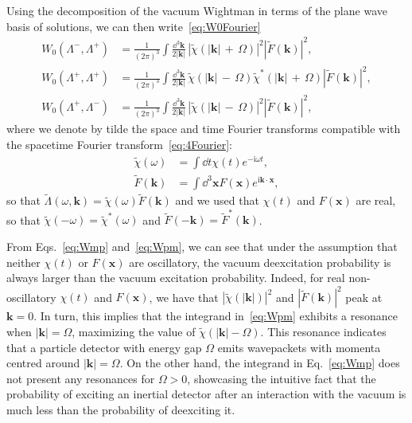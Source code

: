 \documentclass[letterpaper,12pt,titlepage,oneside,final]{book}
\newcommand{\ii}{\mathrm{i}}
\begin{document}
Using the decomposition of the vacuum Wightman in terms of the plane wave basis of solutions, we can then write~\eqref{eq:W0Fourier}
\begin{align}
    W_0(\Lambda^-,\Lambda^+) &= \frac{1}{(2\pi)^3}\int \frac{\dd^3 \bm k}{2|\bm k|}\, |\tilde{\chi}(|\bm k|\,+ \,\Omega)|^2|\tilde{F}(\bm k)|^2,\label{eq:Wmp}\\
    W_0(\Lambda^+,\Lambda^+) &= \frac{1}{(2\pi)^3}\int \frac{\dd^3 \bm k}{2|\bm k|}\, \tilde{\chi}(|\bm k|\,- \,\Omega)\tilde{\chi}^*(|\bm k|\,+ \,\Omega)|\tilde{F}(\bm k)|^2,\\
    W_0(\Lambda^+,\Lambda^-) &= \frac{1}{(2\pi)^3}\int \frac{\dd^3 \bm k}{2|\bm k|}\, |\tilde{\chi}(|\bm k|\,- \,\Omega)|^2|\tilde{F}(\bm k)|^2,\label{eq:Wpm}
\end{align}
where we denote by tilde the space and time Fourier transforms compatible with the spacetime Fourier transform~\eqref{eq:4Fourier}:
\begin{align}
    \tilde{\chi}(\omega) &= \int \dd t \chi(t)e^{-\ii \omega t},\\
    \tilde{F}(\bm k) &= \int \dd^3 \bm x F(\bm x) e^{\ii \bm k \cdot \bm x},
\end{align}
so that $\tilde{\Lambda}(\omega,\bm k) = \tilde{\chi}(\omega)\tilde{F}(\bm k)$ and we used that $\chi(t)$ and $F(\bm x)$ are real, so that $\tilde{\chi}(-\omega) = \tilde{\chi}^*(\omega)$ and $\tilde{F}(-\bm k) = \tilde{F}^*(\bm k)$.

From Eqs.~\eqref{eq:Wmp} and~\eqref{eq:Wpm}, we can see that under the assumption that neither $\chi(t)$ or $F(\bm x)$ are oscillatory, the vacuum deexcitation probability is always larger than the vacuum excitation probability. Indeed, for real non-oscillatory $\chi(t)$ and $F(\bm x)$, we have that $|\tilde{\chi}(|\bm k|)|^2$ and $|\tilde{F}(\bm k)|^2$ peak at $\bm k = 0$. In turn, this implies that the integrand in~\eqref{eq:Wpm} exhibits a resonance when $|\bm k| = \Omega$, maximizing the value of $\tilde{\chi}(|\bm k| - \Omega)$. This resonance indicates that a particle detector with energy gap $\Omega$ emits wavepackets with momenta centred around $|\bm k| = \Omega$. On the other hand, the integrand in Eq.~\eqref{eq:Wmp} does not present any resonances for $\Omega>0$, showcasing the intuitive fact that the probability of exciting an inertial detector after an interaction with the vacuum is much less than the probability of deexciting it.
\end{document}
